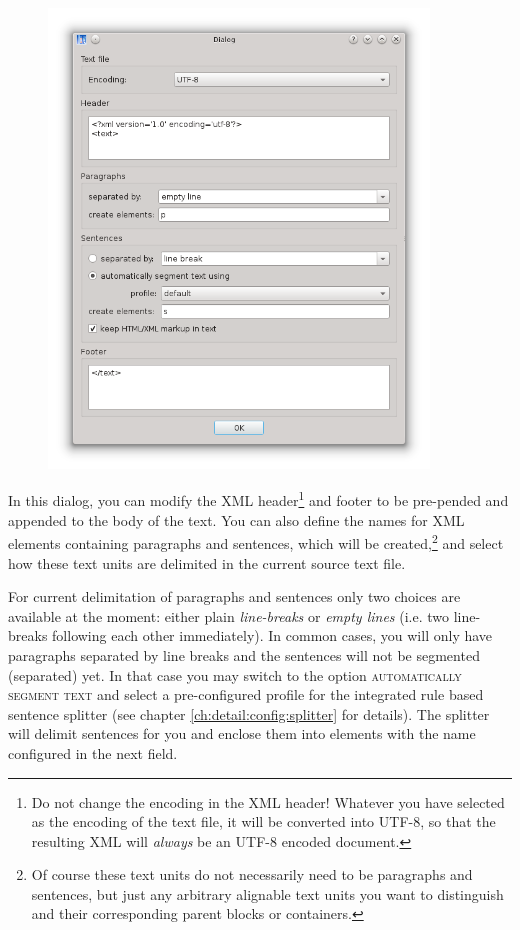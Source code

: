\documentclass[a4paper,10pt,oneside]{book}
\newcommand{\menu}[1]{\textsc{#1}}
\begin{document}
\begin{figure}[htbf]
 \includegraphics[width=0.9\textwidth]{screenshots/text_import.png}
\end{figure}

In this dialog, you can modify the XML header\footnote{Do not change the encoding in the XML header! Whatever you have selected as the encoding of the text file, it will be converted into UTF-8, so that the resulting XML will \emph{always} be an UTF-8 encoded document.} and footer to be pre-pended and appended to the body of the text. You can also define the names for XML elements containing paragraphs and sentences, which will be created,\footnote{Of course these text units do not necessarily need to be paragraphs and sentences, but just any arbitrary alignable text units you want to distinguish and their corresponding parent blocks or containers.} and select how these text units are delimited in the current source text file.

For current delimitation of paragraphs and sentences only two choices are available at the moment: either plain \emph{line-breaks} or \emph{empty lines} (i.e. two line-breaks following each other immediately). In common cases, you will only have paragraphs separated by line breaks and the sentences will not be segmented (separated) yet. In that case you may switch to the option \menu{automatically segment text} and select a pre-configured profile for the integrated rule based sentence splitter (see chapter \ref{ch:detail:config:splitter} for details). The splitter will delimit sentences for you and enclose them into elements with the name configured in the next field.
\end{document}
